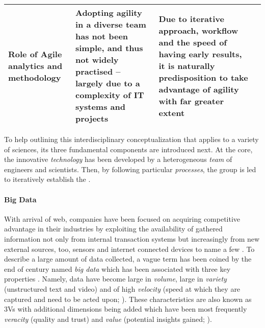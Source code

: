 \begin{spacing}{1.0}
\begin{landscape}
\begin{longtable}{|C{2.5cm}|L{8cm}| L{8cm}|L{4cm}|}
    Role of Agile analytics and methodology & Adopting agility in a diverse team has not been simple, and thus not widely practised -- largely due to a complexity of \ac{IT} systems and projects & Due to iterative approach, workflow and the speed of having early results, it is naturally predisposition to take advantage of agility with far greater extent & \textcites{Collier2011}{Larson2016AScience}{krawatzeck2013agile} \\ \hline
    \end{longtable}
\end{landscape}
\end{spacing}

To help outlining this interdisciplinary conceptualization that applies to a variety of sciences, its three fundamental components are introduced next. 
At the core, the innovative \emph{technology} has been developed by a heterogeneous \emph{team} of engineers and scientists.
Then, by following particular \emph{processes}, the group is led to iteratively establish the  \parencites[72]{LongCao2016}{FrancescoCorea2016DataMyths}{Dhar:2013:DSP:2534706.2500499}{Provost201351}.  

\paragraph*{Big Data}
With arrival of web, companies have been focused on acquiring competitive advantage in their industries by exploiting the availability of gathered information not only from internal transaction systems but increasingly from new external sources, too, sensors and internet connected devices to name a few \parencite{Provost201351}. 
To describe a large amount of data collected, a vague term has been coined by the end of  century named \emph{big data} which has been associated with three key properties \parencites{Carbone2016ChallengesPerspective}{Larson2016AScience}{Jifa2014DataScience}{MauroGreco2015}. 
Namely, data have become large in \emph{volume}, large in \emph{variety} (unstructured text and video) and of high \emph{velocity} (speed at which they are captured and need to be acted upon; \cite{Fern2016,ChenMinMao2014,2014BigChallenges}).
These characteristics are also known as 3Vs with additional dimensions being added which have been most frequently \emph{veracity} (quality and trust) and \emph{value} (potential insights gained; \cite{LongCao2016}). 

